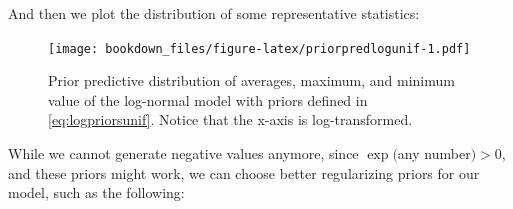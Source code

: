 \documentclass[12pt,]{krantz}
\newenvironment{Shaded}{\begin{snugshade}}{\end{snugshade}}
\newcommand{\KeywordTok}[1]{\textcolor[rgb]{0.13,0.29,0.53}{\textbf{#1}}}
\newcommand{\DataTypeTok}[1]{\textcolor[rgb]{0.13,0.29,0.53}{#1}}
\newcommand{\DecValTok}[1]{\textcolor[rgb]{0.00,0.00,0.81}{#1}}
\newcommand{\FloatTok}[1]{\textcolor[rgb]{0.00,0.00,0.81}{#1}}
\newcommand{\StringTok}[1]{\textcolor[rgb]{0.31,0.60,0.02}{#1}}
\newcommand{\OperatorTok}[1]{\textcolor[rgb]{0.81,0.36,0.00}{\textbf{#1}}}
\newcommand{\NormalTok}[1]{#1}
\theoremstyle{definition}
\theoremstyle{definition}
\theoremstyle{definition}
\theoremstyle{remark}
\begin{document}
And then we plot the distribution of some representative statistics:





\begin{Shaded}
\end{Shaded}

\begin{figure}
\centering
\texttt{[image: bookdown\_files/figure-latex/priorpredlogunif-1.pdf]}
\caption{\label{fig:priorpredlogunif}Prior predictive distribution of averages,
maximum, and minimum value of the log-normal model with priors defined
in \eqref{eq:logpriorsunif}. Notice that the x-axis is log-transformed.}
\end{figure}

While we cannot generate negative values anymore, since \(\exp(\)any
number\() > 0\), and these priors might work, we can choose better
regularizing priors for our model, such as the following:
\end{document}
